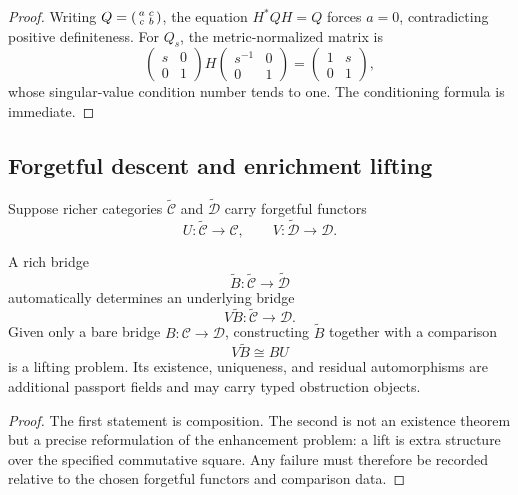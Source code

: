 \begin{proof}
Writing \(Q=\begin{psmallmatrix}a&c\\c&b\end{psmallmatrix}\), the equation \(H^*QH=Q\) forces \(a=0\), contradicting positive definiteness.  For \(Q_s\), the metric-normalized matrix is
\[
 \begin{pmatrix}s&0\\0&1\end{pmatrix}
 H
 \begin{pmatrix}s^{-1}&0\\0&1\end{pmatrix}
 =
 \begin{pmatrix}1&s\\0&1\end{pmatrix},
\]
whose singular-value condition number tends to one.  The conditioning formula is immediate.
\end{proof}

\subsection{Forgetful descent and enrichment lifting}
\label{subsec:block19-doctrine-lifting}

Suppose richer categories \(\widetilde{\mathcal C}\) and \(\widetilde{\mathcal D}\) carry forgetful functors
\[
 U:\widetilde{\mathcal C}\to\mathcal C,
 \qquad
 V:\widetilde{\mathcal D}\to\mathcal D.
\]

\begin{proposition}
\label{prop:block19-forgetful-lifting}
A rich bridge
\[
 \widetilde B:\widetilde{\mathcal C}\to\widetilde{\mathcal D}
\]
automatically determines an underlying bridge
\[
 V\widetilde B:\widetilde{\mathcal C}\to\mathcal D.
\]
Given only a bare bridge \(B:\mathcal C\to\mathcal D\), constructing \(\widetilde B\) together with a comparison
\[
 V\widetilde B\cong BU
\]
is a lifting problem.  Its existence, uniqueness, and residual automorphisms are additional passport fields and may carry typed obstruction objects.
\end{proposition}

\begin{proof}
The first statement is composition.  The second is not an existence theorem but a precise reformulation of the enhancement problem: a lift is extra structure over the specified commutative square.  Any failure must therefore be recorded relative to the chosen forgetful functors and comparison data.
\end{proof}

